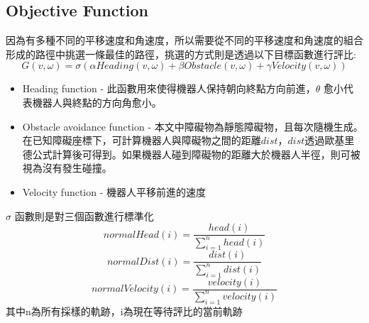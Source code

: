 \documentclass[crop=false]{standalone}
\begin{document}
	\subsection{Objective Function}
	因為有多種不同的平移速度和角速度，所以需要從不同的平移速度和角速度的組合形成的路徑中挑選一條最佳的路徑，挑選的方式則是透過以下目標函數進行評比:
	\begin{equation}
		G(v, \omega)=\sigma(\alpha Heading(v, \omega) + \beta Obstacle(v, \omega) + \gamma Velocity(v, \omega))
	\end{equation}
	\begin{itemize}
		\item Heading function - 此函數用來使得機器人保持朝向終點方向前進，$\theta$ 愈小代表機器人與終點的方向角愈小。
		\item Obstacle avoidance function - 本文中障礙物為靜態障礙物，且每次隨機生成。在已知障礙座標下，可計算機器人與障礙物之間的距離$dist$，$dist$透過歐基里德公式計算後可得到。如果機器人碰到障礙物的距離大於機器人半徑，則可被視為沒有發生碰撞。
		\item Velocity function - 機器人平移前進的速度
	\end{itemize}
	$\sigma$ 函數則是對三個函數進行標準化
	\begin{equation}
		normalHead(i)=\frac{head(i)}{\sum_{i=1}^{n}{head(i)}}
	\end{equation}
	\begin{equation}
		normalDist(i)=\frac{dist(i)}{\sum_{i=1}^{n}{dist(i)}}
	\end{equation}
	\begin{equation}
		normalVelocity(i)=\frac{velocity(i)}{\sum_{i=1}^{n}{velocity(i)}}
	\end{equation}
	其中n為所有採樣的軌跡，i為現在等待評比的當前軌跡
\end{document}
